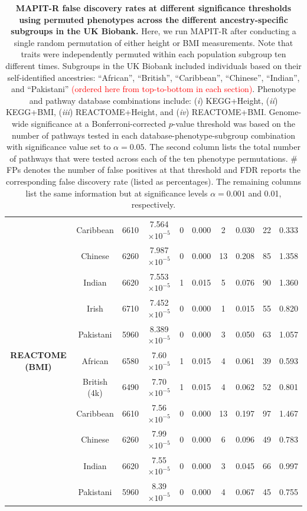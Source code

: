 \documentclass[10pt]{article}
\begin{document}
\begin{landscape}
\begin{table}[ht]
\begin{tabular}{|c|c|c|ccc|cc|cc|}
 & Caribbean & 6610 & 7.564$\times10^{-5}$ & 0 & 0.000 & 2 & 0.030 & 22 & 0.333 \\ 
 & Chinese & 6260 & 7.987$\times10^{-5}$ & 0 & 0.000 & 13 & 0.208 & 85 & 1.358 \\ 
 & Indian & 6620 & 7.553$\times10^{-5}$ & 1 & 0.015 & 5 & 0.076 & 90 & 1.360 \\ 
 & Irish & 6710 & 7.452$\times10^{-5}$ & 0 & 0.000 & 1 & 0.015 & 55 & 0.820 \\
 & Pakistani & 5960 & 8.389$\times10^{-5}$ & 0 & 0.000 & 3 & 0.050 & 63 & 1.057 \\
\hline 
\multirow{6.5}{*}{\textbf{REACTOME (BMI)}} & African & 6580 & 7.60$\times10^{-5}$ & 1 & 0.015 & 4 & 0.061 & 39 & 0.593 \\
 & British (4k) & 6490 & 7.70$\times10^{-5}$ & 1 & 0.015 & 4 & 0.062 & 52 & 0.801 \\
 & Caribbean & 6610 & 7.56$\times10^{-5}$ & 0 & 0.000 & 13 & 0.197 & 97 & 1.467 \\
 & Chinese & 6260 & 7.99$\times10^{-5}$ & 0 & 0.000 & 6 & 0.096 & 49 & 0.783 \\
 & Indian & 6620 & 7.55$\times10^{-5}$ & 0 & 0.000 & 3 & 0.045 & 66 & 0.997 \\
 & Pakistani & 5960 & 8.39$\times10^{-5}$ & 0 & 0.000 & 4 & 0.067 & 45 & 0.755 \\
   \hline
\end{tabular}
\caption[TBD]{\textbf{MAPIT-R false discovery rates at different significance thresholds using permuted phenotypes across the different ancestry-specific subgroups in the UK Biobank.} Here, we run MAPIT-R after conducting a single random permutation of either height or BMI measurements. Note that traits were independently permuted within each population subgroup ten different times. Subgroups in the UK Biobank included individuals based on their self-identified ancestries: ``African'', ``British'', ``Caribbean'', ``Chinese'', ``Indian'', and ``Pakistani'' \textcolor{red}{(ordered here from top-to-bottom in each section)}. Phenotype and pathway database combinations include: (\textit{i}) KEGG+Height, (\textit{ii}) KEGG+BMI, (\textit{iii}) REACTOME+Height, and (\textit{iv}) REACTOME+BMI. Genome-wide significance at a Bonferroni-corrected $p$-value threshold was based on the number of pathways tested in each database-phenotype-subgroup combination with significance value set to $\alpha = 0.05$. The second column lists the total number of pathways that were tested across each of the ten phenotype permutations. \# FPs denotes the number of false positives at that threshold and FDR reports the corresponding false discovery rate (listed as percentages). The remaining columns list the same information but at significance levels $\alpha = 0.001$ and 0.01, respectively.}
\label{InterPath-Supp-Table-AllPops-FDRs}
\end{table}

\end{landscape}
\clearpage
\end{document}
